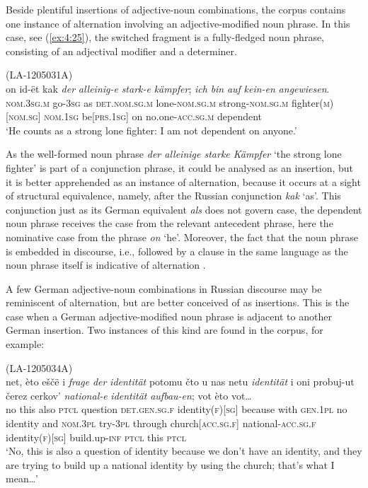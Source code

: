 Beside plentiful insertions of adjective-noun combinations, the corpus contains one instance of alternation involving an adjective-modified noun phrase. In this case, see (\ref{ex:4:25}), the switched fragment is a fully-fledged noun phrase, consisting of an adjectival modifier and a determiner.

\ea
\label{ex:4:25}
(LA-1205031A)\\
 \gll on id-ët kak \textit{der} \textit{alleinig-e} \textit{stark-e} \textit{kämpfer}; \textit{ich} \textit{bin} \textit{auf} \textit{kein-en} \textit{angewiesen}.\\
 \textsc{nom.3sg.m} go-\textsc{3sg} as \textsc{det.nom.sg.m} lone-\textsc{nom.sg.m} strong-\textsc{nom.sg.m} fighter(\textsc{m})[\textsc{nom.sg}] \textsc{nom.1sg} be[\textsc{prs.1sg}] on no.one-\textsc{acc.sg.m} dependent\\
\glt `He counts as a strong lone fighter: I am not dependent on anyone.'
\z

\noindent As the well-formed noun phrase \textit{der alleinige starke Kämpfer} `the strong lone fighter' is part of a conjunction phrase, it could be analysed as an insertion, but it is better apprehended as an instance of alternation, because it occurs at a sight of structural equivalence, namely, after the Russian conjunction \textit{kak} `as'. This conjunction just as its German equivalent \textit{als} does not govern case, the dependent noun phrase receives the case from the relevant antecedent phrase, here the nominative case from the phrase \textit{on} `he'. Moreover, the fact that the noun phrase is embedded in discourse, i.e.,  followed by a clause in the same language as the noun phrase itself is indicative of alternation \citep[cf.][104]{muysken-bilingual-2000}.

A few German adjective-noun combinations in Russian discourse may be reminiscent of alternation, but are better conceived of as insertions. This is the case when a German adjective-modified noun phrase is adjacent to another German insertion. Two instances of this kind are found in the corpus, for example:

\ea
\label{ex:4:26}
(LA-1205034A)\\
 \gll net, èto eščë i \textit{frage} \textit{der} \textit{identität}  potomu čto u nas netu \textit{identität}  i oni probuj-ut čerez cerkov' \textit{national-e} \textit{identität} \textit{aufbau-en}; vot èto vot\dots\\
 no this also \textsc{ptcl} question \textsc{det.gen.sg.f} identity(\textsc{f})[\textsc{sg}]  because {} with \textsc{gen.1pl} no identity and \textsc{nom.3pl} try-\textsc{3pl} through church\textsc{[acc.sg.f]} national-\textsc{acc.sg.f} identity(\textsc{f})[\textsc{sg}] build.up-\textsc{inf} \textsc{ptcl} this \textsc{ptcl}\\
\glt `No, this is also a question of identity because we don't have an identity, and they are trying to build up a national identity by using the church; that's what I mean\dots'
\z

